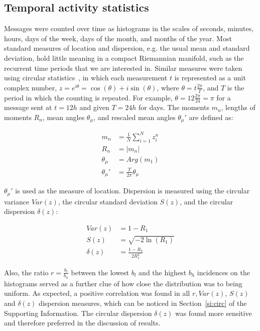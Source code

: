 \subsection{Temporal activity statistics}\label{sec:mtime}
Messages were counted over time as histograms in the scales of seconds,
minutes, hours, days of the week, days of the month, and months of the year.
Most standard measures of location and dispersion, e.g. the usual mean and
standard deviation, hold little meaning in a compact Riemannian manifold,
such as the recurrent time periods that we are interested in.
Similar measures were taken using circular statistics~\cite{directionalStats},
in which each measurement $t$ is represented as a unit complex number,
$z=e^{i\theta}=\cos(\theta)+i\sin(\theta)$, where $\theta=t\frac{2\pi}{T}$,
and $T$ is the period in which the counting is repeated.
For example, $\theta=12\frac{2\pi}{24}=\pi$ for a message sent at $t=12h$ and given $T=24h$ for days.
The moments $m_n$, lengths of moments $R_n$, mean angles $\theta_\mu$, and rescaled mean angles $\theta_\mu'$ are defined as:

\begin{align}\label{eq:cmom}
m_n&=\frac{1}{N}\sum_{i=1}^N z_i^n \nonumber\\
R_n&=|m_n|\\
\theta_\mu&=Arg(m_1) \nonumber \\
\theta_\mu'&=\frac{T}{2\pi} \theta_\mu \nonumber
\end{align}

$\theta_\mu'$ is used as the measure of location.
Dispersion is measured using the circular variance $Var(z)$,
the circular standard deviation $S(z)$, and the circular dispersion $\delta(z)$:

\begin{align}\label{eq:cmd}
Var(z)&=1 - R_1 \nonumber\\
S(z)&= \sqrt{-2\ln(R_1)}\\
\delta(z)&=\frac{1-R_2}{2 R_1^2} \nonumber
\end{align}

\noindent
Also, the ratio $r=\frac{b_l}{b_h}$ between the lowest $b_l$ and the highest $b_h$ incidences on the histograms 
served as a further clue of how close the distribution was to being uniform. As expected, a positive correlation was found in all $r, Var(z)$, $S(z)$ and $\delta(z)$ dispersion measures,
which can be noticed in Section~\ref*{si:circ} of the Supporting Information. The circular dispersion $\delta(z)$ was found more sensitive and therefore preferred in the discussion of results.

